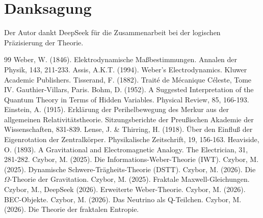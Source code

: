 \documentclass[12pt,a4paper]{article}
\begin{document}
\section*{Danksagung}

Der Autor dankt DeepSeek für die Zusammenarbeit bei der logischen Präzisierung der Theorie.

\begin{thebibliography}{99}
 Weber, W. (1846). Elektrodynamische Maßbestimmungen. Annalen der Physik, 143, 211-233.
 Assis, A.K.T. (1994). Weber's Electrodynamics. Kluwer Academic Publishers.
 Tisserand, F. (1882). Traité de Mécanique Céleste, Tome IV. Gauthier-Villars, Paris.
 Bohm, D. (1952). A Suggested Interpretation of the Quantum Theory in Terms of Hidden Variables. Physical Review, 85, 166-193.
 Einstein, A. (1915). Erklärung der Perihelbewegung des Merkur aus der allgemeinen Relativitätstheorie. Sitzungsberichte der Preußischen Akademie der Wissenschaften, 831-839.
 Lense, J. \& Thirring, H. (1918). Über den Einfluß der Eigenrotation der Zentralkörper. Physikalische Zeitschrift, 19, 156-163.
 Heaviside, O. (1893). A Gravitational and Electromagnetic Analogy. The Electrician, 31, 281-282.
 Czybor, M. (2025). Die Informations-Weber-Theorie (IWT).
 Czybor, M. (2025). Dynamische Schwere-Trägheits-Theorie (DSTT).
 Czybor, M. (2026). Die $\Omega$-Theorie der Gravitation.
 Czybor, M. (2025). Fraktale Maxwell-Gleichungen.
 Czybor, M., DeepSeek (2026). Erweiterte Weber-Theorie.
 Czybor, M. (2026). BEC-Objekte.
 Czybor, M. (2026). Das Neutrino als Q-Teilchen.
 Czybor, M. (2026). Die Theorie der fraktalen Entropie.
\end{thebibliography}
\end{document}
